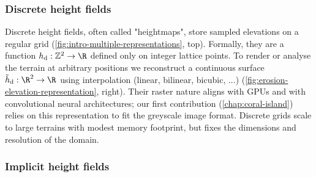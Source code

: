 \subsubsection{Discrete height fields}
Discrete height fields, often called "heightmaps", store sampled elevations on a regular grid (\cref{fig:intro-multiple-representations}, top). Formally, they are a function $h_{ \text{d}} : \mathbb{Z}^{2} \to \R$ defined only on integer lattice points. To render or analyse the terrain at arbitrary positions we reconstruct a continuous surface $ \tilde{h}_{ \text{d}} : \R^{2} \to \R$ using interpolation (linear, bilinear, bicubic, ...) (\cref{fig:erosion-elevation-representation}, right). Their raster nature aligns with GPUs and with convolutional neural architectures; our first contribution (\cref{chap:coral-island}) relies on this representation to fit the greyscale image format. Discrete grids scale to large terrains with modest memory footprint, but fixes the dimensions and resolution of the domain. %

\subsubsection{Implicit height fields}

